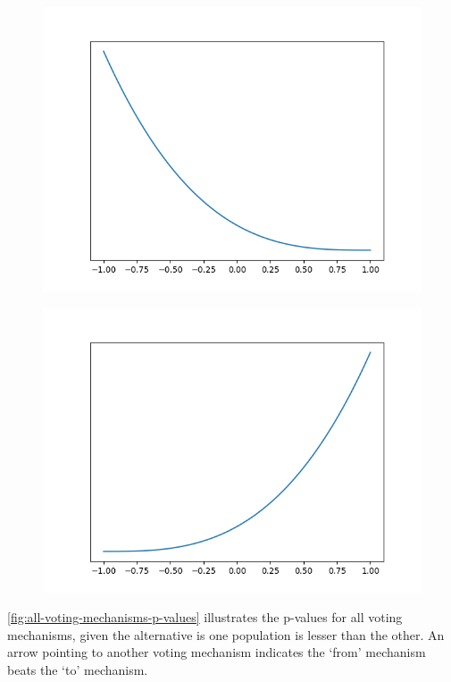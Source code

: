 \begin{figure}[!h]
    \centering
    \includegraphics[scale=0.5]
    {./content/figures/dists/beta_1_4}
    \caption{}
    \label{fig:beta-1-4}
\end{figure}

\begin{figure}[!h]
    \centering
    \includegraphics[scale=0.5]
    {./content/figures/dists/beta_4_1}
    \caption{}
    \label{fig:beta-4-1}
\end{figure}

\autoref{fig:all-voting-mechanisms-p-values} illustrates the p-values for all voting
mechanisms, given the alternative is one population is lesser than the other.
An arrow pointing to another voting mechanism indicates the `from' mechanism beats
the `to' mechanism.

